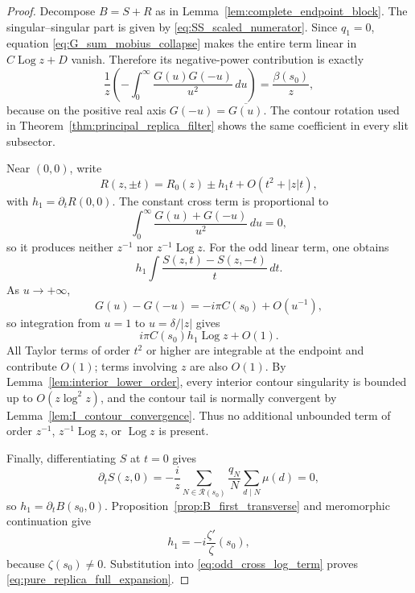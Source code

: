 \documentclass[11pt]{amsart}
\numberwithin{equation}{section}
\theoremstyle{plain}
\theoremstyle{definition}
\theoremstyle{remark}
\newcommand{\Log}{\operatorname{Log}}
\begin{document}
\begin{proof}
Decompose \(B=S+R\) as in Lemma~\ref{lem:complete_endpoint_block}.  The
singular--singular part is given by \eqref{eq:SS_scaled_numerator}.  Since
\(q_1=0\), equation \eqref{eq:G_sum_mobius_collapse} makes the entire term
linear in \(C\Log z+D\) vanish.  Therefore its negative-power contribution is
exactly
\begin{equation}
\frac1z\left(-\int_0^\infty\frac{G(u)G(-u)}{u^2}\,du\right)
=
\frac{\beta(s_0)}z,
\label{eq:SS_beta_exact}
\end{equation}
because on the positive real axis \(G(-u)=\overline{G(u)}\).  The contour
rotation used in Theorem~\ref{thm:principal_replica_filter} shows the same
coefficient in every slit subsector.

Near \((0,0)\), write
\begin{equation}
R(z,\pm t)=R_0(z)\pm h_1t+O(t^2+|z|t),
\label{eq:R_local_taylor}
\end{equation}
with \(h_1=\partial_tR(0,0)\).  The constant cross term is proportional to
\begin{equation}
\int_0^\infty\frac{G(u)+G(-u)}{u^2}\,du=0,
\label{eq:constant_cross_zero}
\end{equation}
so it produces neither \(z^{-1}\) nor \(z^{-1}\Log z\).  For the odd linear
term, one obtains
\begin{equation}
h_1\int\frac{S(z,t)-S(z,-t)}t\,dt.
\label{eq:odd_cross_integral}
\end{equation}
As \(u\to+\infty\),
\begin{equation}
G(u)-G(-u)=-i\pi C(s_0)+O(u^{-1}),
\label{eq:G_odd_infinity}
\end{equation}
so integration from \(u=1\) to \(u=\delta/|z|\) gives
\begin{equation}
i\pi C(s_0)h_1\Log z+O(1).
\label{eq:odd_cross_log_term}
\end{equation}
All Taylor terms of order \(t^2\) or higher are integrable at the endpoint
and contribute \(O(1)\); terms involving \(z\) are also \(O(1)\).  By
Lemma~\ref{lem:interior_lower_order}, every interior contour singularity is
bounded up to \(O(z\log^2z)\), and the contour tail is normally convergent by
Lemma~\ref{lem:I_contour_convergence}.  Thus no additional unbounded term of
order \(z^{-1}\), \(z^{-1}\Log z\), or \(\Log z\) is present.

Finally, differentiating \(S\) at \(t=0\) gives
\begin{equation}
\partial_tS(z,0)
=-\frac{i}{z}
\sum_{N\in\mathcal R(s_0)}\frac{q_N}{N}
\sum_{d\mid N}\mu(d)=0,
\label{eq:S_t_derivative_pure_replica}
\end{equation}
so \(h_1=\partial_tB(s_0,0)\).  Proposition~\ref{prop:B_first_transverse}
and meromorphic continuation give
\begin{equation}
h_1=-i\frac{\zeta'}{\zeta}(s_0),
\label{eq:h1_logderivative}
\end{equation}
because \(\zeta(s_0)\ne0\).  Substitution into
\eqref{eq:odd_cross_log_term} proves \eqref{eq:pure_replica_full_expansion}.
\end{proof}
\end{document}
